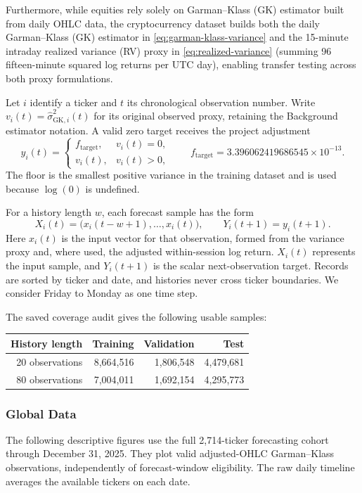 \documentclass[12pt,a4paper]{article}
\numberwithin{equation}{section}
\numberwithin{table}{section}
\numberwithin{figure}{section}
\begin{document}
Furthermore, while equities rely solely on Garman--Klass (GK) estimator built from daily OHLC data, the cryptocurrency dataset builds both the daily Garman--Klass (GK) estimator in \eqref{eq:garman-klass-variance} and the 15-minute intraday realized variance (RV) proxy in \eqref{eq:realized-variance} (summing 96 fifteen-minute squared log returns per UTC day), enabling transfer testing across both proxy formulations.

Let $i$ identify a ticker and $t$ its chronological observation number. Write $v_i(t)=\widehat\sigma^2_{\mathrm{GK},i}(t)$ for its original observed proxy, retaining the Background estimator notation. A valid zero target receives the project adjustment
\begin{equation}\label{eq:methods-target-floor}
y_i(t)=
\begin{cases}
f_{\mathrm{target}},&v_i(t)=0,\\
v_i(t),&v_i(t)>0,
\end{cases}
\qquad f_{\mathrm{target}}=3.396062419686545\times10^{-13}.
\end{equation}
The floor is the smallest positive variance in the training dataset and is used because $\log(0)$ is undefined. 

For a history length $w$, each forecast sample has the form
\begin{equation}\label{eq:methods-sample}
X_i(t)=\bigl(x_i(t-w+1),\ldots,x_i(t)\bigr),
\qquad Y_i(t+1)=y_i(t+1).
\end{equation}
Here $x_i(t)$ is the input vector for that observation, formed from the variance proxy and, where used, the adjusted within-session log return. $X_i(t)$ represents the input sample, and $Y_i(t+1)$ is the scalar next-observation target. Records are sorted by ticker and date, and histories never cross ticker boundaries. We consider Friday to Monday as one time step.

The saved coverage audit gives the following usable samples:
\begin{center}
\begin{tabular}{r|rrr}
History length & Training & Validation & Test \\
\hline
20 observations & 8,664,516 & 1,806,548 & 4,479,681 \\
80 observations & 7,004,011 & 1,692,154 & 4,295,773
\end{tabular}
\end{center}

\subsubsection{Global Data}
The following descriptive figures use the full 2,714-ticker forecasting cohort through December 31, 2025. They plot valid adjusted-OHLC Garman--Klass observations, independently of forecast-window eligibility. The raw daily timeline averages the available tickers on each date.
\end{document}
